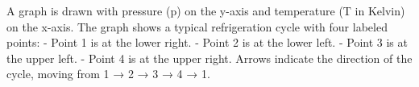 A graph is drawn with pressure (p) on the y-axis and temperature (T in Kelvin) on the x-axis. The graph shows a typical refrigeration cycle with four labeled points:  
- Point 1 is at the lower right.  
- Point 2 is at the lower left.  
- Point 3 is at the upper left.  
- Point 4 is at the upper right.  
Arrows indicate the direction of the cycle, moving from 1 → 2 → 3 → 4 → 1.